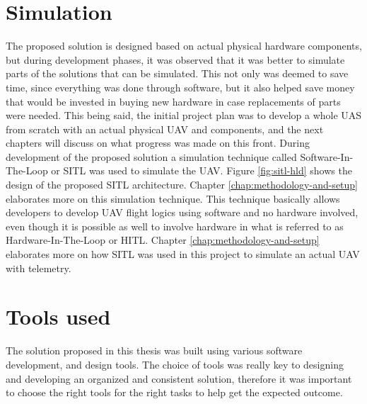 



\section{Simulation}
\label{sec:simulation}

The proposed solution is designed based on actual physical hardware components, but during development phases, it was observed that it was better to simulate parts of the solutions that can be simulated. This not only was deemed to save time, since everything was done through software, but it also helped save money that would be invested in buying new hardware in case replacements of parts were needed. This being said, the initial project plan was to develop a whole UAS from scratch with an actual physical UAV and components, and the next chapters will discuss on what progress was made on this front. During development of the proposed solution a simulation technique called Software-In-The-Loop or SITL\cite{Giese2021} was used to simulate the UAV. Figure \ref{fig:sitl-hld} shows the design of the proposed SITL architecture. Chapter \ref{chap:methodology-and-setup} elaborates more on this simulation technique. This technique basically allows developers to develop UAV flight logics using software and no hardware involved, even though it is possible as well to involve hardware in what is referred to as Hardware-In-The-Loop or HITL\cite{px4hitluserguide}. Chapter \ref{chap:methodology-and-setup} elaborates more on how SITL was used in this project to simulate an actual UAV with telemetry.




\section{Tools used}
\label{sec:tools-used}

The solution proposed in this thesis was built using various software development, and design tools. The choice of tools was really key to designing and developing an organized and consistent solution, therefore it was important to choose the right tools for the right tasks to help get the expected outcome.

